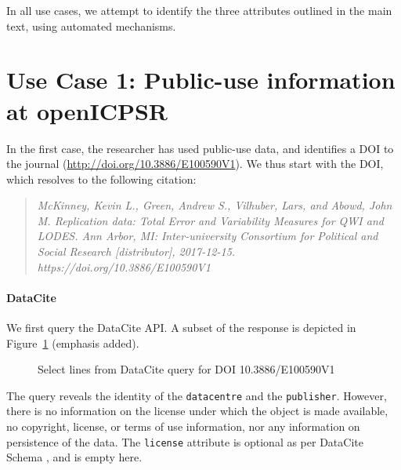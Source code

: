 In all use cases, we attempt to identify the three attributes outlined in the main text, using automated mechanisms.

\section{Use Case 1: Public-use information at openICPSR}
In the first case, the researcher has  used public-use data, and identifies a \ac{DOI} to the journal (\url{http://doi.org/10.3886/E100590V1}).  We thus start with the \ac{DOI}, which resolves to the following citation:

\begin{quote}
	\it
	McKinney, Kevin L., Green, Andrew S., Vilhuber, Lars, and Abowd, John M. Replication data: Total Error and Variability Measures for QWI and LODES. Ann Arbor, MI: Inter-university Consortium for Political and Social Research [distributor], 2017-12-15. https://doi.org/10.3886/E100590V1
\end{quote}

\FloatBarrier
\paragraph{DataCite}

We first query the DataCite API. A subset of the response is depicted in Figure~\ref{fig:case1:datacite} (emphasis added).
\begin{figure}
	\singlespacing
	
	
	
	
	
	
	\caption{Select lines from DataCite query for DOI 10.3886/E100590V1}
	\label{fig:case1:datacite}
\end{figure}
%
The query reveals the identity of the \texttt{datacentre} and the \texttt{publisher}. However, there is no information on the license under which the object is made available, no copyright, license, or terms of use information, nor any information on persistence of the data. The \texttt{license} attribute is optional as per DataCite Schema \parencite{DataCiteMetadataWorkingGroupDataCiteMetadataSchema2017}, and is empty here.

